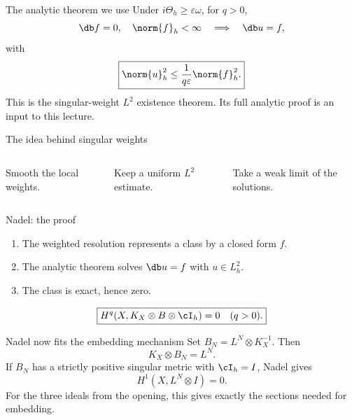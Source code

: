 \begin{frame}{The analytic theorem we use}
Under \(i\Theta_h\ge\varepsilon\omega\), for \(q>0\),
\[
\db f=0,\quad \norm{f}_h<\infty
\quad\Longrightarrow\quad
\db u=f,
\]
with
\[
\boxed{\norm{u}_h^2\le\frac{1}{q\varepsilon}\norm{f}_h^2.}
\]
This is the singular-weight \(L^2\) existence theorem.
Its full analytic proof is an input to this lecture.
\end{frame}

\begin{frame}{The idea behind singular weights}
\begin{columns}[c]
\centering
{}
Smooth the local weights.
\par\bigskip
\par Keep a uniform \(L^2\) estimate.
\par\bigskip
\par Take a weak limit of the solutions.
\end{columns}
\end{frame}

\begin{frame}{Nadel: the proof}
\begin{enumerate}
\setlength{\itemsep}{14pt}
\item The weighted resolution represents a class by a closed form \(f\).
\item The analytic theorem solves \(\db u=f\) with \(u\in L^2_h\).
\item The class is exact, hence zero.
\end{enumerate}
\[
\boxed{H^q(X,K_X\otimes B\otimes\cI_h)=0\quad(q>0).}
\]
\end{frame}

\begin{frame}{Nadel now fits the embedding mechanism}
Set \(B_N=L^N\otimes K_X^{-1}\). Then
\[
K_X\otimes B_N=L^N.
\]
If \(B_N\) has a strictly positive singular metric with \(\cI_h=I\), Nadel gives
\[
\boxed{H^1(X,L^N\otimes I)=0.}
\]
For the three ideals from the opening, this gives exactly the sections needed for embedding.
\end{frame}

